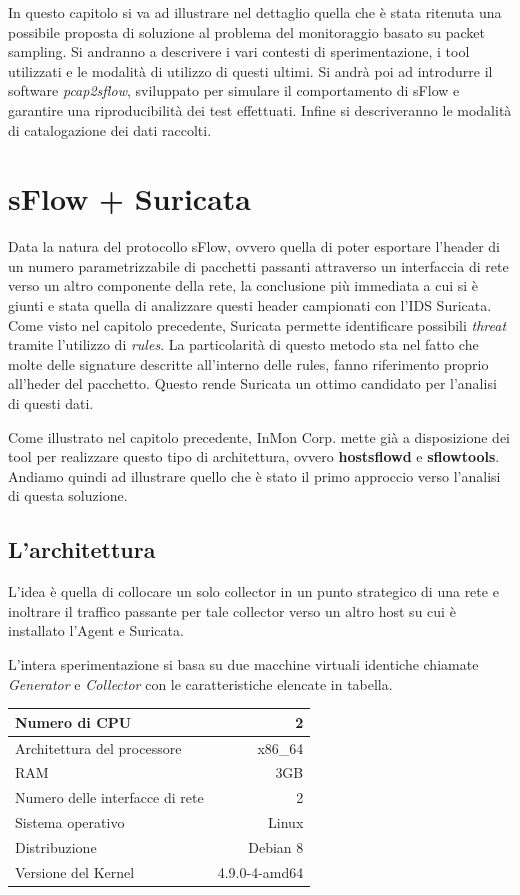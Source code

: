 \documentclass[12pt,a4paper,openright,twoside]{report}
\begin{document}
In questo capitolo si va ad illustrare nel dettaglio quella che \`e stata ritenuta una possibile
proposta di soluzione al problema del monitoraggio basato su packet sampling. Si andranno
a descrivere i vari contesti di sperimentazione, i tool utilizzati e le modalit\`a di
utilizzo di questi ultimi. Si andr\`a poi ad introdurre il software {\it pcap2sflow}, sviluppato per
simulare il comportamento di sFlow e garantire una riproducibilit\`a dei test effettuati.
Infine si descriveranno le modalit\`a di catalogazione dei dati raccolti.

\section{sFlow + Suricata}

Data la natura del protocollo sFlow, ovvero quella di poter esportare l'header di
un numero parametrizzabile di pacchetti passanti attraverso un interfaccia di rete verso
un altro componente della rete, la conclusione pi\`u immediata a cui si \`e giunti
e stata quella di analizzare questi header campionati con l'IDS Suricata.
Come visto nel capitolo precedente, Suricata permette identificare possibili {\it threat}
tramite l'utilizzo di {\it rules}. La particolarit\`a di questo metodo sta nel fatto che
molte delle signature descritte all'interno delle rules, fanno riferimento proprio all'heder del
pacchetto. Questo rende Suricata un ottimo candidato per l'analisi di questi dati.

Come illustrato nel capitolo precedente, InMon Corp. mette gi\`a a disposizione dei
tool per realizzare questo tipo di architettura, ovvero {\bf hostsflowd} e {\bf sflowtools}.
Andiamo quindi ad illustrare quello che \`e stato il primo approccio verso l'analisi di
questa soluzione.

\subsection{L'architettura}

L'idea \`e quella di collocare un solo collector in un punto strategico di una rete e
inoltrare il traffico passante per tale collector verso un altro host su cui \`e installato
l'Agent e Suricata.

L'intera sperimentazione si basa su due macchine virtuali identiche chiamate {\it Generator} e {\it Collector}
con le caratteristiche elencate in tabella.

\begin{center}
  \begin{tabular}{| l | r |}
    \hline
    Numero di CPU & 2 \\ \hline
    Architettura del processore & x86\_64 \\ \hline
    RAM & 3GB \\ \hline
    Numero delle interfacce di rete & 2 \\ \hline
    Sistema operativo & Linux \\ \hline
    Distribuzione & Debian 8 \\ \hline
    Versione del Kernel & 4.9.0-4-amd64 \\ \hline
  \end{tabular}
\end{center}
\end{document}
